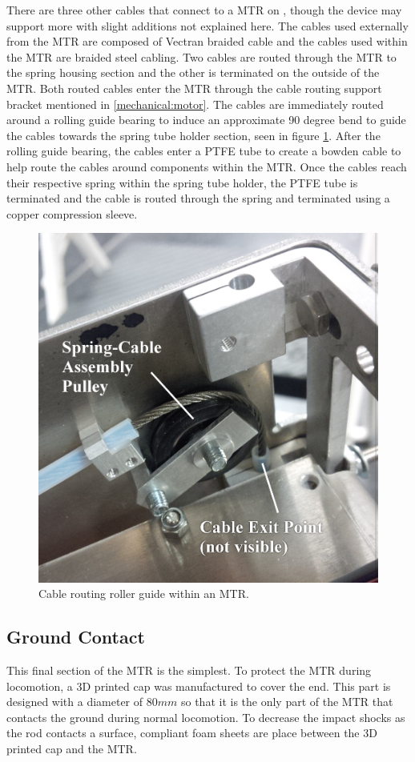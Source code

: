 There are three other cables that connect to a MTR on \SB{}, though the device may support more with slight additions not explained here.
The cables used externally from the MTR are composed of Vectran braided cable and the cables used within the MTR are braided steel cabling. 
Two cables are routed through the MTR to the spring housing section and the other is terminated on the outside of the MTR.
Both routed cables enter the MTR through the cable routing support bracket mentioned in \ref{mechanical:motor}.
The cables are immediately routed around a rolling guide bearing to induce an approximate 90 degree bend to guide the cables towards the spring tube holder section, seen in figure \ref{fig:roller_guide}.
After the rolling guide bearing, the cables enter a PTFE tube to create a bowden cable to help route the cables around components within the MTR.
Once the cables reach their respective spring within the spring tube holder, the PTFE tube is terminated and the cable is routed through the spring and terminated using a copper compression sleeve.

\begin{figure}[thpb]
      \centering
      \includegraphics[width=0.6\columnwidth]{tex/img/cable_pulley_bearing_labelled_fixedfonts}
      \caption{Cable routing roller guide within an MTR.}
      \label{fig:roller_guide}
\end{figure}

\subsection{Ground Contact} 
This final section of the MTR is the simplest. 
To protect the MTR during locomotion, a 3D printed cap was manufactured to cover the end.
This part is designed with a diameter of \(80mm\) so that it is the only part of the MTR that contacts the ground during normal locomotion.
To decrease the impact shocks as the rod contacts a surface, compliant foam sheets are place between the 3D printed cap and the MTR.

